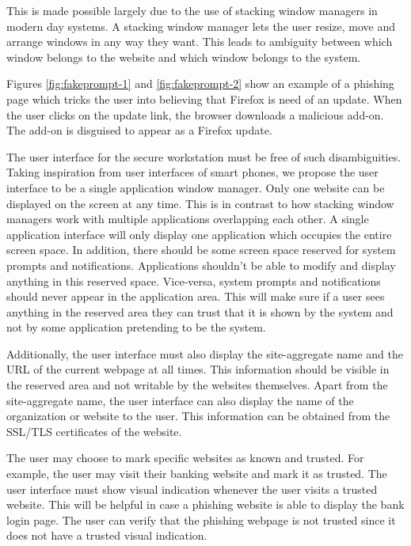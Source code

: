 This is made possible largely due to the use of stacking window managers in modern day systems. A stacking window manager lets the user resize, move and arrange windows in any way they want. This leads to ambiguity between which window belongs to the website and which window belongs to the system.

Figures \ref{fig:fakeprompt-1} and \ref{fig:fakeprompt-2} show an example of a phishing page which tricks the user into believing that Firefox is need of an update. When the user clicks on the update link, the browser downloads a malicious add-on. The add-on is disguised to appear as a Firefox update.

The user interface for the secure workstation must be free of such disambiguities. Taking inspiration from user interfaces of smart phones, we propose the user interface to be a single application window manager. Only one website can be displayed on the screen at any time. This is in contrast to how stacking window managers work with multiple applications overlapping each other. A single application interface will only display one application which occupies the entire screen space. In addition, there should be some screen space reserved for system prompts and notifications. Applications shouldn't be able to modify and display anything in this reserved space. Vice-versa, system prompts and notifications should never appear in the application area. This will make sure if a user sees anything in the reserved area they can trust that it is shown by the system and not by some application pretending to be the system.

Additionally, the user interface must also display the site-aggregate name and the URL of the current webpage at all times. This information should be visible in the reserved area and not writable by the websites themselves. Apart from the site-aggregate name, the user interface can also display the name of the organization or website to the user. This information can be obtained from the SSL/TLS certificates of the website.

The user may choose to mark specific websites as known and trusted. For example, the user may visit their banking website and mark it as trusted. The user interface must show visual indication whenever the user visits a trusted website. This will be helpful in case a phishing website is able to display the bank login page. The user can verify that the phishing webpage is not trusted since it does not have a trusted visual indication.
